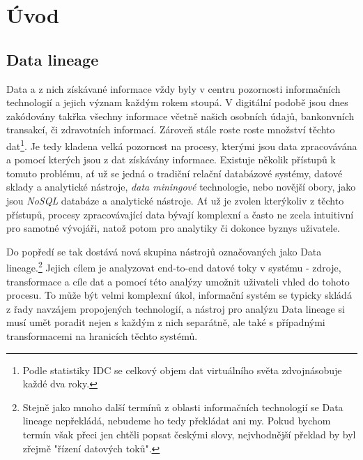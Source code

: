 \chapter{Úvod}
\label{sec:uvod}
\section{Data lineage}

Data a z nich získávané informace vždy byly v centru pozornosti informačních technologií a jejich význam každým rokem stoupá. V digitální podobě jsou dnes zakódovány takřka všechny informace včetně našich osobních údajů, bankonvních transakcí, či zdravotních informací. Zároveň stále roste roste množství těchto dat\footnote{Podle statistiky IDC \cite{Idc14} se celkový objem dat virtuálního světa zdvojnásobuje každé dva roky.}.
Je tedy kladena velká pozornost na procesy, kterými jsou data zpracovávána a pomocí kterých jsou z dat získávány informace. Existuje několik přístupů k tomuto problému, ať už se jedná o tradiční relační databázové systémy, datové sklady a \textit{} analytické nástroje, \textit{data miningové} technologie, nebo novější obory, jako jsou \textit{NoSQL} databáze a analytické nástroje. Ať už je zvolen kterýkoliv z těchto přístupů, procesy zpracovávající data bývají komplexní a často ne zcela intuitivní pro samotné vývojáři, natož potom pro analytiky či dokonce byznys uživatele.

Do popředí se tak dostává nová skupina nástrojů označovaných jako Data lineage.\footnote{Stejně jako mnoho další termínů z oblasti informačních technologií se Data lineage nepřekládá, nebudeme ho tedy překládat ani my. Pokud bychom termín však přeci jen chtěli popsat českými slovy, nejvhodnější překlad by byl zřejmě "řízení datových toků".}
Jejich cílem je analyzovat end-to-end datové toky v systému - zdroje, transformace a cíle dat a pomocí této analýzy umožnit uživateli vhled do tohoto procesu. To může být velmi komplexní úkol, informační systém se typicky skládá z řady navzájem propojených technologií, a nástroj pro analýzu Data lineage si musí umět poradit nejen s každým z nich separátně, ale také s případnými transformacemi na hranicích těchto systémů.

